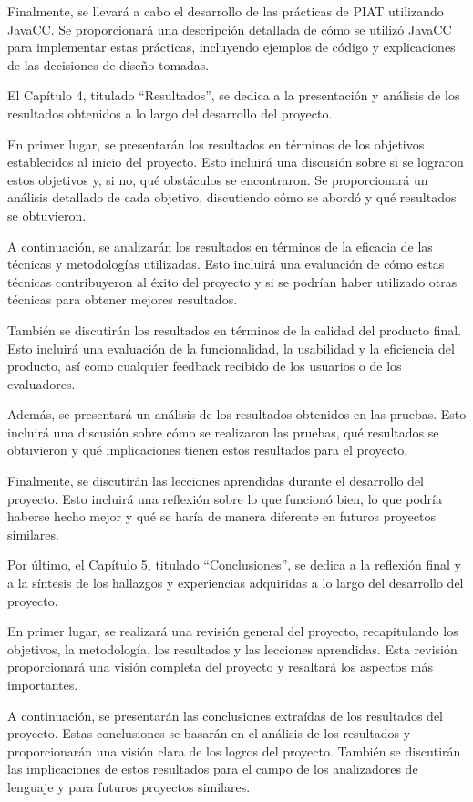 Finalmente, se llevará a cabo el desarrollo de las prácticas de PIAT utilizando JavaCC. Se proporcionará una descripción detallada de cómo se utilizó JavaCC para implementar estas prácticas, incluyendo ejemplos de código y explicaciones de las decisiones de diseño tomadas.

El Capítulo 4, titulado “Resultados”, se dedica a la presentación y análisis de los resultados obtenidos a lo largo del desarrollo del proyecto.

En primer lugar, se presentarán los resultados en términos de los objetivos establecidos al inicio del proyecto. Esto incluirá una discusión sobre si se lograron estos objetivos y, si no, qué obstáculos se encontraron. Se proporcionará un análisis detallado de cada objetivo, discutiendo cómo se abordó y qué resultados se obtuvieron.

A continuación, se analizarán los resultados en términos de la eficacia de las técnicas y metodologías utilizadas. Esto incluirá una evaluación de cómo estas técnicas contribuyeron al éxito del proyecto y si se podrían haber utilizado otras técnicas para obtener mejores resultados.

También se discutirán los resultados en términos de la calidad del producto final. Esto incluirá una evaluación de la funcionalidad, la usabilidad y la eficiencia del producto, así como cualquier feedback recibido de los usuarios o de los evaluadores.

Además, se presentará un análisis de los resultados obtenidos en las pruebas. Esto incluirá una discusión sobre cómo se realizaron las pruebas, qué resultados se obtuvieron y qué implicaciones tienen estos resultados para el proyecto.

Finalmente, se discutirán las lecciones aprendidas durante el desarrollo del proyecto. Esto incluirá una reflexión sobre lo que funcionó bien, lo que podría haberse hecho mejor y qué se haría de manera diferente en futuros proyectos similares.

Por último, el Capítulo 5, titulado “Conclusiones”, se dedica a la reflexión final y a la síntesis de los hallazgos y experiencias adquiridas a lo largo del desarrollo del proyecto.

En primer lugar, se realizará una revisión general del proyecto, recapitulando los objetivos, la metodología, los resultados y las lecciones aprendidas. Esta revisión proporcionará una visión completa del proyecto y resaltará los aspectos más importantes.

A continuación, se presentarán las conclusiones extraídas de los resultados del proyecto. Estas conclusiones se basarán en el análisis de los resultados y proporcionarán una visión clara de los logros del proyecto. También se discutirán las implicaciones de estos resultados para el campo de los analizadores de lenguaje y para futuros proyectos similares.

